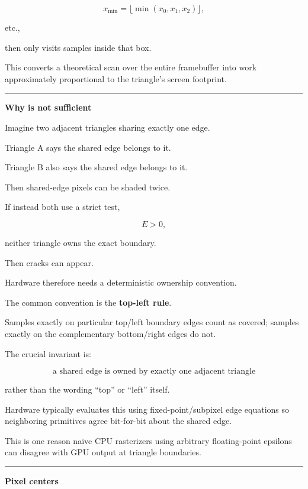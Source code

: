 \[
x_{\min}=
\lfloor\min(x_0,x_1,x_2)\rfloor,
\]

etc.,

then only visits samples inside that box.

This converts a theoretical scan over the entire framebuffer into work approximately proportional to the triangle's screen footprint.

\begin{center}\rule{0.5\linewidth}{0.5pt}\end{center}

\textbf{Why  is not sufficient}

Imagine two adjacent triangles sharing exactly one edge.

Triangle A says the shared edge belongs to it.

Triangle B also says the shared edge belongs to it.

Then shared-edge pixels can be shaded twice.

If instead both use a strict test,

\[
E>0,
\]

neither triangle owns the exact boundary.

Then cracks can appear.

Hardware therefore needs a deterministic ownership convention.

The common convention is the \textbf{top-left rule}.

Samples exactly on particular top/left boundary edges count as covered; samples exactly on the complementary bottom/right edges do not.

The crucial invariant is:

\[
\boxed{
\text{a shared edge is owned by exactly one adjacent triangle}
}
\]

rather than the wording ``top'' or ``left'' itself.

Hardware typically evaluates this using fixed-point/subpixel edge equations so neighboring primitives agree bit-for-bit about the shared edge.

This is one reason naive CPU rasterizers using arbitrary floating-point epsilons can disagree with GPU output at triangle boundaries.

\begin{center}\rule{0.5\linewidth}{0.5pt}\end{center}

\textbf{Pixel centers}

